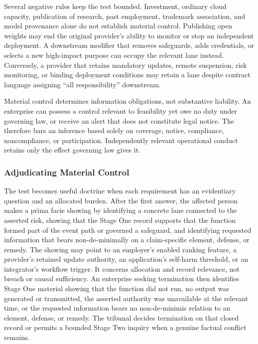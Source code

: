 Several negative rules keep the test bounded. Investment, ordinary cloud capacity, publication of research, past employment, trademark association, and model provenance alone do not establish material control. Publishing open weights may end the original provider's ability to monitor or stop an independent deployment. A downstream modifier that removes safeguards, adds credentials, or selects a new high-impact purpose can occupy the relevant lane instead. Conversely, a provider that retains mandatory updates, remote suspension, risk monitoring, or binding deployment conditions may retain a lane despite contract language assigning ``all responsibility'' downstream.

Material control determines information obligations, not substantive liability. An enterprise can possess a control relevant to feasibility yet owe no duty under governing law, or receive an alert that does not constitute legal notice. The  therefore bars an inference based solely on coverage, notice, compliance, noncompliance, or participation. Independently relevant operational conduct retains only the effect governing law gives it.

\subsubsection{Adjudicating Material Control}

The test becomes useful doctrine when each requirement has an evidentiary question and an allocated burden. After the first answer, the affected person makes a prima facie showing by identifying a concrete lane connected to the asserted risk, showing that the Stage One record supports that the function formed part of the event path or governed a safeguard, and identifying requested information that bears non-de-minimally on a claim-specific element, defense, or remedy. The showing may point to an employer's enabled ranking feature, a provider's retained update authority, an application's self-harm threshold, or an integrator's workflow trigger. It concerns allocation and record relevance, not breach or causal sufficiency. An enterprise seeking termination then identifies Stage One material showing that the function did not run, no output was generated or transmitted, the asserted authority was unavailable at the relevant time, or the requested information bears no non-de-minimis relation to an element, defense, or remedy. The tribunal decides termination on that closed record or permits a bounded Stage Two inquiry when a genuine factual conflict remains.

